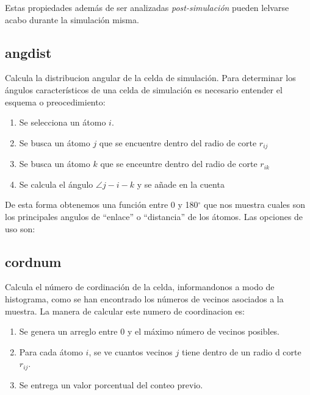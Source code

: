 Estas propiedades adem\'as de ser analizadas \textit{post-simulaci\'on} pueden lelvarse acabo durante la simulaci\'on misma.

\subsection{angdist}
Calcula la distribucion angular de la celda de simulaci\'on. Para determinar los \'angulos caracter\'isticos de una celda de simulaci\'on es necesario entender el esquema o preocedimiento:
\begin{enumerate}
 \item Se selecciona un \'atomo $i$.
 \item Se busca un \'atomo $j$ que se encuentre dentro del radio de corte $r_{ij}$
 \item Se busca un \'atomo $k$ que se enceuntre dentro del radio de corte $r_{ik}$
 \item Se calcula el \'angulo  $\angle j-i-k$ y se a\~nade en la cuenta
\end{enumerate}

De esta forma obtenemos una funci\'on entre 0 y 180$^\circ$ que nos muestra cuales son los principales angulos de ``enlace'' o ``distancia'' de los \'atomos. Las opciones de uso son:


\subsection{cordnum}
Calcula el n\'umero de cordinaci\'on de la celda, informandonos a modo de histograma, como se han encontrado los n\'umeros de vecinos asociados a la muestra. La manera de calcular este numero de coordinacion es:
\begin{enumerate}
 \item Se genera un arreglo entre 0 y el m\'aximo n\'umero de vecinos posibles.
 \item Para cada \'atomo $i$, se ve cuantos vecinos $j$ tiene dentro de un radio d corte $r_{ij}$.
 \item Se entrega un valor porcentual del conteo previo.
\end{enumerate}

